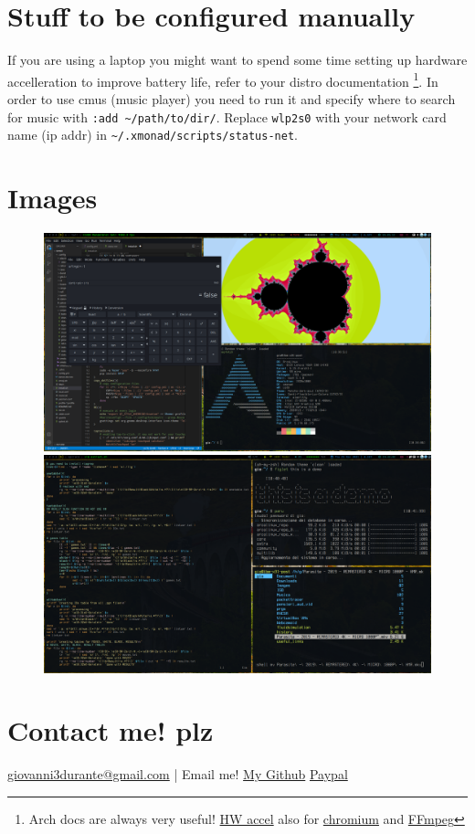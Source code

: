 \documentclass{article}
\begin{document}
\section*{Stuff to be configured manually}
If you are using a laptop you might want to spend some time setting up hardware accelleration to improve battery life, refer to your distro documentation \footnote{Arch docs are always very useful! \href{https://wiki.archlinux.org/index.php/Hardware_video_acceleration}{HW accel} also for \href{https://wiki.archlinux.org/index.php/chromium#Hardware_video_acceleration}{chromium} and \href{https://trac.ffmpeg.org/wiki/HWAccelIntro}{FFmpeg}}. In order to use cmus (music player) you need to run it and specify where to search for music with \verb|:add ~/path/to/dir/|. Replace \verb|wlp2s0| with your network card name (ip addr) in \verb|~/.xmonad/scripts/status-net|.

\section*{Images}

\begin{figure}[h!]
    \includegraphics[width=19.3cm]{dance_prew2.png}
    \newline
    \includegraphics[width=19.3cm]{dance_prew3.png}
    \newline
\end{figure}

\section*{Contact me! plz}
\href{mailto:giovanni3durante@gmail.com}{giovanni3durante@gmail.com} | Email me!
\newline
\href{https://github.com/durryx}{My Github}
\newline
\href{https://www.paypal.com/paypalme/durrysas}{Paypal}
\end{document}
